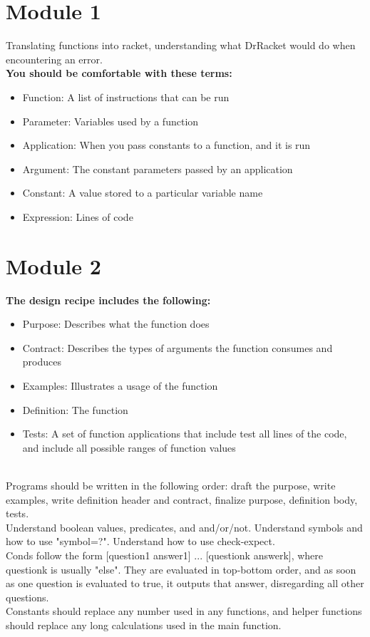 \documentclass[12pt,letter]{article}
\begin{document}
\section*{Module 1}
Translating functions into racket, understanding what DrRacket would do when encountering an error. \\ 
\textbf{You should be comfortable with these terms:} 
\begin{itemize}
    \item Function: A list of instructions that can be run  
    \item Parameter: Variables used by a function
    \item Application: When you pass constants to a function, and it is run
    \item Argument: The constant parameters passed by an application
    \item Constant: A value stored to a particular variable name
    \item Expression: Lines of code
\end{itemize}

\section*{Module 2}
\textbf{The design recipe includes the following:}
\begin{itemize}
    \item Purpose: Describes what the function does 
    \item Contract: Describes the types of arguments the function consumes and produces
    \item Examples: Illustrates a usage of the function 
    \item Definition: The function 
    \item Tests: A set of function applications that include test all lines of the code, and include all possible ranges of function values
\end{itemize}\\ 
Programs should be written in the following order: draft the purpose, write examples, write definition header and contract, finalize purpose, definition body, tests. \\ 
Understand boolean values, predicates, and and/or/not. Understand symbols and how to use "symbol=?". Understand how to use check-expect. \\ 
Conds follow the form [question1 answer1] ... [questionk answerk], where questionk is usually "else". They are evaluated in top-bottom order, and as soon as one question is evaluated to true, it outputs that answer, disregarding all other questions. \\ 
Constants should replace any number used in any functions, and helper functions should replace any long calculations used in the main function.
\end{document}
